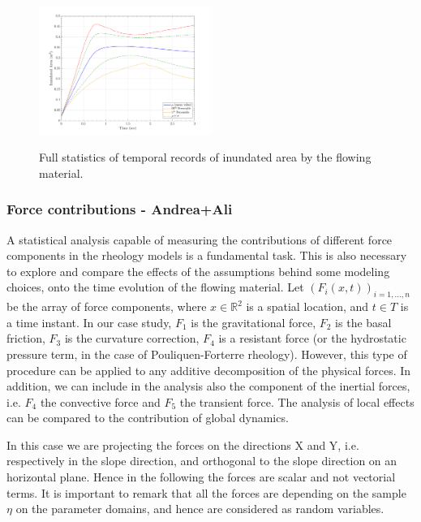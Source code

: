 \documentclass{article}
\begin{document}
\begin{figure}[H]
        \begin{minipage}[b]{1\linewidth}
                \centering
                \includegraphics[width=0.5\textwidth]{InclinedPlane/GlobalRecords/V_Global_Ar.png}
                \label{fig:Ramp-SP-InundAr-V}
        \end{minipage}
        \caption{Full statistics of temporal records of inundated area by the flowing material.}
        \label{fig:Ramp-SP-InundAr}
\end{figure}

\subsubsection{Force contributions - Andrea+Ali}
A statistical analysis capable of measuring the contributions of different force components in the rheology models is a fundamental task. This is also necessary to explore and compare the effects of the assumptions behind some modeling choices, onto the time evolution of the flowing material. Let $(F_i(x,t))_{i=1,\dots, n}$ be the array of force components, where $x\in\mathbb R^2$ is a spatial location, and $t\in T$ is a time instant. In our case study, $F_1$ is the gravitational force, $F_2$ is the basal friction, $F_3$ is the curvature correction, $F_4$ is a resistant force (or the hydrostatic pressure term, in the case of Pouliquen-Forterre rheology). However, this type of procedure can be applied to any additive decomposition of the physical forces. In addition, we can include in the analysis also the component of the inertial forces, i.e. $F_4$ the convective force and $F_5$ the transient force. The analysis of local effects can be compared to the contribution of global dynamics.

In this case we are projecting the forces on the directions X and Y, i.e. respectively in the slope direction, and orthogonal to the slope direction on an horizontal plane. Hence in the following the forces are scalar and not vectorial terms. It is important to remark that all the forces are depending on the sample $\eta$ on the parameter domains, and hence are considered as random variables.
\end{document}
